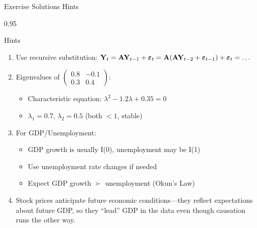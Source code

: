 \documentclass[9pt, aspectratio=169, t]{beamer}
\begin{document}
\begin{frame}{Exercise Solutions Hints}
    \begin{cminipage}{0.95\textwidth}
    {\footnotesize
    \begin{block}{Hints}
        \begin{enumerate}\setlength{\itemsep}{1pt}
            \item Use recursive substitution: $\mathbf{Y}_t = \mathbf{A}\mathbf{Y}_{t-1} + \boldsymbol{\varepsilon}_t = \mathbf{A}(\mathbf{A}\mathbf{Y}_{t-2} + \boldsymbol{\varepsilon}_{t-1}) + \boldsymbol{\varepsilon}_t = \ldots$

            \item Eigenvalues of $\begin{pmatrix} 0.8 & -0.1 \\ 0.3 & 0.4 \end{pmatrix}$:
                \begin{itemize}\setlength{\itemsep}{0pt}
                    \item Characteristic equation: $\lambda^2 - 1.2\lambda + 0.35 = 0$
                    \item $\lambda_1 = 0.7$, $\lambda_2 = 0.5$ (both $< 1$, stable)
                \end{itemize}

            \item For GDP/Unemployment:
                \begin{itemize}\setlength{\itemsep}{0pt}
                    \item GDP growth is usually I(0), unemployment may be I(1)
                    \item Use unemployment rate changes if needed
                    \item Expect GDP growth $\succ$ unemployment (Okun's Law)
                \end{itemize}

            \item Stock prices anticipate future economic conditions---they reflect expectations about future GDP, so they ``lead'' GDP in the data even though causation runs the other way.
        \end{enumerate}
    \end{block}
    }
    \end{cminipage}
\end{frame}
\end{document}
